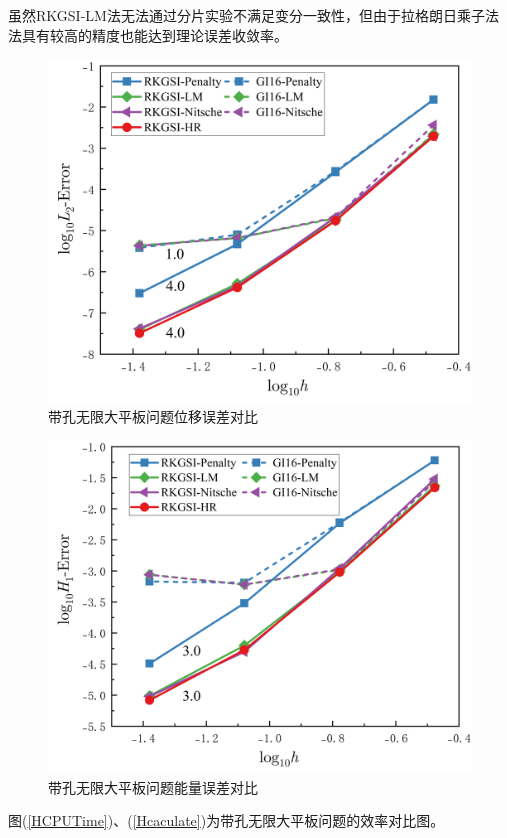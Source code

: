 虽然RKGSI-LM法无法通过分片实验不满足变分一致性，但由于拉格朗日乘子法法具有较高的精度也能达到理论误差收敛率。
\begin{figure}[!h]
    \centering
    \includegraphics[scale=0.5]{figure/hole/L2.png}
    \caption{带孔无限大平板问题位移误差对比}\label{HL2}
\end{figure}
\begin{figure}[!h]
    \centering
    \includegraphics[scale=0.5]{figure/hole/H1.png}
    \caption{带孔无限大平板问题能量误差对比}\label{HH1}
\end{figure}\newpage
图(\ref{HCPUTime})、(\ref{Hcaculate})为带孔无限大平板问题的效率对比图。
